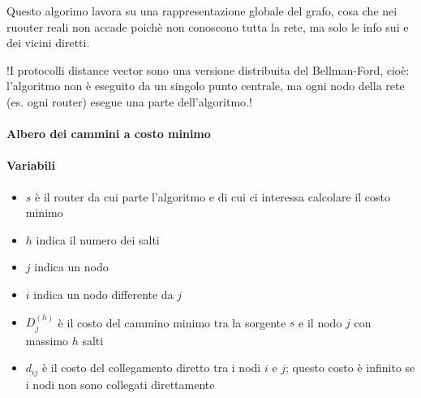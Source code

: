 Questo algorimo lavora su una rappresentazione globale del grafo, cosa che nei ruouter reali non accade poichè non conoscono tutta la rete, ma solo le info sui e dei vicini diretti.

!I protocolli distance vector sono una versione distribuita del Bellman-Ford, cioè: l'algoritmo non è eseguito da un singolo punto centrale, ma ogni nodo della rete (es. ogni router) esegue una parte dell'algoritmo.!

\paragraph{Albero dei cammini a costo minimo}


\paragraph{Variabili}
\begin{multicols}{2}
\begin{itemize}
    \item $s$ è il router da cui parte l'algoritmo e di cui ci interessa calcolare il costo minimo
    \item $h$ indica il numero dei salti
    \item $j$ indica un nodo
    \item $i$ indica un nodo differente da $j$
    \item $D_j^{(h)}$ è il costo del cammino minimo tra la sorgente $s$ e il nodo $j$ con massimo $h$ salti
    \item $d_{ij}$ è il costo del collegamento diretto tra i nodi $i$ e $j$; questo costo è infinito se i nodi non sono collegati direttamente
\end{itemize}
\end{multicols}




